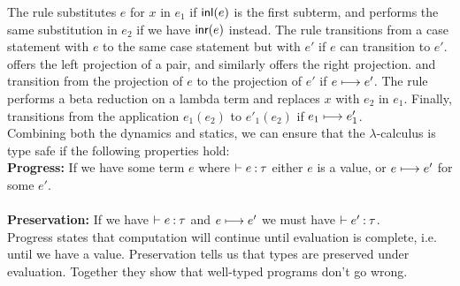 \noindent
The  rule substitutes $e$ for $x$ in $e_1$ if $\textsf{inl}(e)$ is the first subterm, 
and  performs the same substitution in $e_2$ if we have $\textsf{inr}(e)$ instead. 
The  rule transitions from a case statement with $e$ to the same case statement 
but with $e'$ if $e$ can transition to $e'$.  offers the left projection of 
a pair, and similarly  offers the right projection.  and 
 transition from the projection of $e$ to the projection of $e'$ if 
$e \longmapsto e'$. The  rule performs a beta reduction on a lambda term and replaces $x$ 
with $e_2$ in $e_1$. Finally,  transitions from the application $e_1 (e_2)$ to 
$e'_1 (e_2)$ if $e_1 \longmapsto e'_1$. \\

\noindent
Combining both the dynamics and statics, we can ensure that the $\lambda$-calculus is type safe 
if the following properties hold: \\

\noindent
\textbf{Progress:} If we have some term $e$ where $\vdash e\mathbin{:}\tau$ either $e$ is a 
value, or $e \longmapsto e'$ for some $e'$. \\\\
\textbf{Preservation:} If we have $\vdash e\mathbin{:}\tau$ and $e \longmapsto e'$ we must have 
$\vdash e'\mathbin{:}\tau$. \\

\noindent
Progress states that computation will continue until evaluation is complete, i.e. until we have a 
value. Preservation tells us that types are preserved under evaluation. Together they show that 
well-typed programs don't go wrong. 


